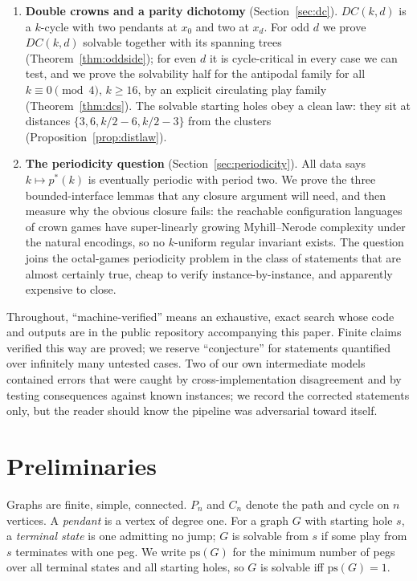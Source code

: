 \documentclass[11pt]{article}
\theoremstyle{definition}
\newcommand{\ps}{\mathrm{ps}}
\begin{document}
\begin{enumerate}
occur: for $1{,}810$ graphs the best spanning tree strands two pegs,
for the remaining $29$ it strands three. We conjecture this is
sharp in general: one extra edge rescues at most two pegs
(Conjecture~\ref{conj:rescue}).
\item \textbf{Double crowns and a parity dichotomy}
(Section~\ref{sec:dc}). $DC(k,d)$ is a $k$-cycle with two pendants
at $x_0$ and two at $x_d$. For odd $d$ we prove $DC(k,d)$ solvable
together with its spanning trees (Theorem~\ref{thm:oddside}); for
even $d$ it is cycle-critical in every case we can test, and we
prove the solvability half for the antipodal family for all
$k\equiv 0\pmod 4$, $k\ge 16$, by an explicit circulating play
family (Theorem~\ref{thm:dcs}). The solvable starting holes obey a
clean law: they sit at distances $\{3,6,k/2-6,k/2-3\}$ from the
clusters (Proposition~\ref{prop:distlaw}).
\item \textbf{The periodicity question}
(Section~\ref{sec:periodicity}). All data says $k\mapsto p^*(k)$ is
eventually periodic with period two. We prove the three
bounded-interface lemmas that any closure argument will need, and
then measure why the obvious closure fails: the reachable
configuration languages of crown games have super-linearly growing
Myhill--Nerode complexity under the natural encodings, so no
$k$-uniform regular invariant exists. The question joins the
octal-games periodicity problem \cite{GuyNowakowski} in the class of
statements that are almost certainly true, cheap to verify
instance-by-instance, and apparently expensive to close.
\end{enumerate}

Throughout, ``machine-verified'' means an exhaustive, exact search
whose code and outputs are in the public repository accompanying this
paper. Finite claims verified this way are proved; we reserve
``conjecture'' for statements quantified over infinitely many
untested cases. Two of our own intermediate models contained errors
that were caught by cross-implementation disagreement and by testing
consequences against known instances; we record the corrected
statements only, but the reader should know the pipeline was
adversarial toward itself.

\section{Preliminaries}\label{sec:prelim}

Graphs are finite, simple, connected. $P_n$ and $C_n$ denote the
path and cycle on $n$ vertices. A \emph{pendant} is a vertex of
degree one. For a graph $G$ with starting hole $s$, a
\emph{terminal state} is one admitting no jump; $G$ is solvable from
$s$ if some play from $s$ terminates with one peg. We write
$\ps(G)$ for the minimum number of pegs over all terminal states and
all starting holes, so $G$ is solvable iff $\ps(G)=1$.
\end{document}
